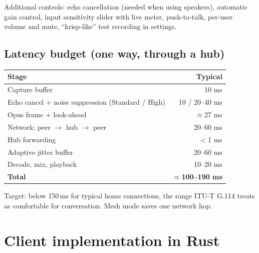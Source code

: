 \documentclass[11pt,a4paper]{article}
\begin{document}
\noindent Additional controls: echo cancellation (needed when using speakers), automatic
gain control, input sensitivity slider with live meter, push-to-talk, per-user volume and
mute, ``krisp-like'' test recording in settings.

\subsection{Latency budget (one way, through a hub)}
\begin{center}
\small
\begin{tabular}{@{}lr@{}}
\toprule
\textbf{Stage} & \textbf{Typical} \\
\midrule
Capture buffer & 10 ms \\
Echo cancel + noise suppression (Standard / High) & 10 / 20--40 ms \\
Opus frame + look-ahead & $\approx$27 ms \\
Network: peer $\to$ hub $\to$ peer & 20--60 ms \\
Hub forwarding & $<$1 ms \\
Adaptive jitter buffer & 20--60 ms \\
Decode, mix, playback & 10--20 ms \\
\midrule
\textbf{Total} & \textbf{$\approx$100--190 ms} \\
\bottomrule
\end{tabular}
\end{center}
Target: below 150\,ms for typical home connections, the range ITU-T G.114 treats as
comfortable for conversation. Mesh mode saves one network hop.

\section{Client implementation in Rust}
\end{document}
